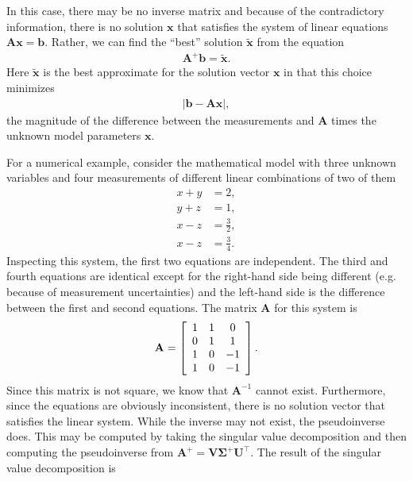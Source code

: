 In this case, there may be no inverse matrix and because of the contradictory information, there is no solution $\mathbf{x}$ that satisfies the system of linear equations $\mathbf{Ax} = \mathbf{b}$. Rather, we can find the ``best'' solution $\tilde{\mathbf{x}}$ from the equation
\begin{align}
  \mathbf{A}^+ \mathbf{b} = \tilde{\mathbf{x}}.
\end{align}
Here $\tilde{\mathbf{x}}$ is the best approximate for the solution vector $\mathbf{x}$ in that this choice minimizes
\begin{align}
  | \mathbf{b} - \mathbf{Ax} | , \nonumber
\end{align}
the magnitude of the difference between the measurements and $\mathbf{A}$ times the unknown model parameters $\mathbf{x}$.

For a numerical example, consider the mathematical model with three unknown variables and four measurements of different linear combinations of two of them
\begin{align}
  x + y &= 2, \nonumber \\
  y + z &= 1, \nonumber \\
  x - z &=  \frac{3}{2}, \nonumber \\
  x - z &=  \frac{3}{4}. \nonumber
\end{align}
Inspecting this system, the first two equations are independent. The third and fourth equations are identical except for the right-hand side being different (e.g. \, because of measurement uncertainties) and the left-hand side is the difference between the first and second equations. The matrix $\mathbf{A}$ for this system is
\begin{align}
  \mathbf{A} = \left[ \begin{array}{c c c}
   1 &  1 &  0 \\
   0 &  1 &  1 \\
   1 &  0 & -1 \\
   1 &  0 & -1 \\ \end{array} \right] .
\end{align}
Since this matrix is not square, we know that $\mathbf{A}^{-1}$ cannot exist. Furthermore, since the equations are obviously inconsistent, there is no solution vector that satisfies the linear system. While the inverse may not exist, the pseudoinverse does. This may be computed by taking the singular value decomposition and then computing the pseudoinverse from $\mathbf{A}^+ = \mathbf{V} \boldsymbol\Sigma^+ \mathbf{U}^\top$. The result of the singular value decomposition is
